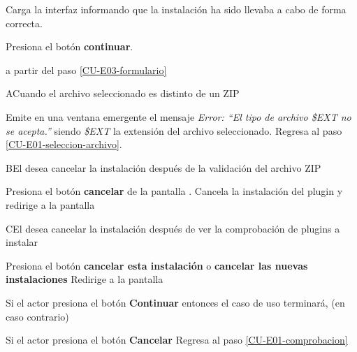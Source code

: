 \begin{UCtrayectoria}
    \Sistema Carga la interfaz  informando que la instalación
             ha sido llevaba a cabo de forma correcta. 

    \Actor Presiona el botón {\bf continuar}.

     a partir del paso \ref{CU-E03-formulario}
\end{UCtrayectoria}

\begin{UCtrayectoriaA}{A}{Cuando el archivo seleccionado es distinto de un ZIP}

  \Sistema Emite en una ventana emergente el mensaje {\it Error: ``El tipo de
           archivo \$EXT no se acepta.''} siendo {\it\$EXT} la extensión del
           archivo seleccionado.
  \Sistema Regresa al paso \ref{CU-E01-seleccion-archivo}.

\end{UCtrayectoriaA}

\begin{UCtrayectoriaA}%
{B}{El  desea cancelar la instalación después de la validación del archivo ZIP}

    \Actor Presiona el botón {\bf cancelar} de la pantalla .
    \Sistema Cancela la instalación del plugin y redirige a la pantalla 

\end{UCtrayectoriaA}

\begin{UCtrayectoriaA}%
{C}{El  desea cancelar la instalación después de ver la comprobación de plugins a instalar}

    \Actor Presiona el botón {\bf cancelar esta instalación} o {\bf cancelar las nuevas instalaciones}
    \Sistema Redirige a la pantalla 

    \Actor Si el actor presiona el botón {\bf Continuar} entonces
    \UCpaso[--] el caso de uso terminará, (en caso contrario)

    \Actor Si el actor presiona el botón {\bf Cancelar}
    \Sistema Regresa al paso \ref{CU-E01-comprobacion}
\end{UCtrayectoriaA}



%
%
